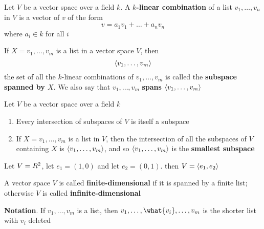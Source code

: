 \documentclass[11pt]{article}
\begin{document}
 
\begin{definition}[]
Let \(V\) be a vector space over a field \(k\). A \textbf{\(k\)-linear combination} of a
list \(v_1,\dots,v_n\) in \(V\) is a vector of \(v\) of the form
\begin{equation*}
v=a_1v_1+\dots+a_nv_n
\end{equation*}
where \(a_i\in k\) for all \(i\)
\end{definition}

\begin{definition}[]
If \(X=v_1,\dots,v_m\) is a list in a vector space \(V\), then
\begin{equation*}
\langle v_1,\dots,v_m\rangle
\end{equation*}
the set of all the \(k\)-linear combinations of \(v_1,\dots,v_m\) is called
the \textbf{subspace spanned by \(X\)}. We also say that \(v_1,\dots,v_m\) \textbf{spans}
\(\langle v_1,\dots,v_m\rangle\)
\end{definition}

\begin{lemma}[]
Let \(V\) be a vector space over a field \(k\)
\begin{enumerate}
\item Every intersection of subspaces of \(V\) is itself a subspace
\item If \(X=v_1,\dots,v_m\) is a list in \(V\), then the intersection of all the
subspaces of \(V\) containing \(X\) is \(\langle v_1,\dots,v_m\rangle\), and so 
\(\langle v_1,\dots,v_m\rangle\) is the \textbf{smallest subspace}
\end{enumerate}
\end{lemma}

\begin{examplle}[]
Let \(V=\relax{R}^2\), let \(e_1=(1,0)\) and let \(e_2=(0,1)\). then \(V=\langle
    e_1,e_2\rangle\) 
\end{examplle}

\begin{definition}[]
A vector space \(V\) is called \textbf{finite-dimensional} if it is spanned by a finite
list; otherwise \(V\) is called \textbf{infinite-dimensional}
\end{definition}

\textbf{Notation}. If \(v_1,\dots,v_m\) is a list, then
\(v_1,\dots,\what{v_i},\dots,v_m\) is the shorter list with \(v_i\) deleted
\end{document}
